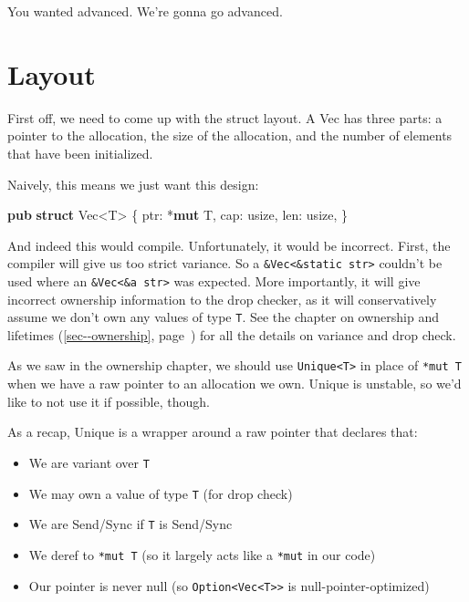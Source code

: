 \documentclass[a4paper,]{book}
\renewcommand*{\hyperref}[2][\ar]{%
  \def\ar{#2}%
  #2 (\autoref{#1}, page~\pageref{#1})}
\newenvironment{Shaded}{\begin{snugshade}}{\end{snugshade}}
\newcommand{\KeywordTok}[1]{\textcolor[rgb]{0.13,0.29,0.53}{\textbf{{#1}}}}
\newcommand{\DataTypeTok}[1]{\textcolor[rgb]{0.13,0.29,0.53}{{#1}}}
\newcommand{\NormalTok}[1]{{#1}}
\providecommand{\tightlist}{%
  \setlength{\itemsep}{0pt}\setlength{\parskip}{0pt}}
\begin{document}
You wanted advanced. We're gonna go advanced.

\section{Layout}\label{sec--vec-layout}

First off, we need to come up with the struct layout. A Vec has three
parts: a pointer to the allocation, the size of the allocation, and the
number of elements that have been initialized.

Naively, this means we just want this design:

\begin{Shaded}
\begin{Highlighting}[]
\KeywordTok{pub} \KeywordTok{struct} \DataTypeTok{Vec}\NormalTok{<T> \{}
    \NormalTok{ptr: *}\KeywordTok{mut} \NormalTok{T,}
    \NormalTok{cap: }\DataTypeTok{usize}\NormalTok{,}
    \NormalTok{len: }\DataTypeTok{usize}\NormalTok{,}
\NormalTok{\}}
\end{Highlighting}
\end{Shaded}

And indeed this would compile. Unfortunately, it would be incorrect.
First, the compiler will give us too strict variance. So a
\texttt{\&Vec\textless{}\&\textquotesingle{}static\ str\textgreater{}}
couldn't be used where an
\texttt{\&Vec\textless{}\&\textquotesingle{}a\ str\textgreater{}} was
expected. More importantly, it will give incorrect ownership information
to the drop checker, as it will conservatively assume we don't own any
values of type \texttt{T}. See \hyperref[sec--ownership]{the chapter on
ownership and lifetimes} for all the details on variance and drop check.

As we saw in the ownership chapter, we should use
\texttt{Unique\textless{}T\textgreater{}} in place of \texttt{*mut\ T}
when we have a raw pointer to an allocation we own. Unique is unstable,
so we'd like to not use it if possible, though.

As a recap, Unique is a wrapper around a raw pointer that declares that:

\begin{itemize}
\tightlist
\item
  We are variant over \texttt{T}
\item
  We may own a value of type \texttt{T} (for drop check)
\item
  We are Send/Sync if \texttt{T} is Send/Sync
\item
  We deref to \texttt{*mut\ T} (so it largely acts like a \texttt{*mut}
  in our code)
\item
  Our pointer is never null (so
  \texttt{Option\textless{}Vec\textless{}T\textgreater{}\textgreater{}}
  is null-pointer-optimized)
\end{itemize}
\end{document}
